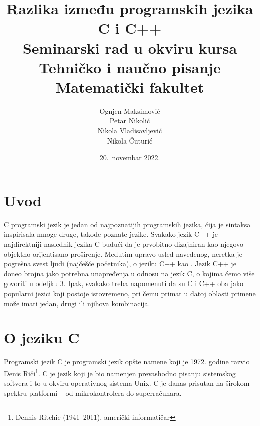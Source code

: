 \documentclass[a4paper]{article}
\begin{document}
\title{Razlika između programskih jezika C i C++\\ \small{Seminarski rad u okviru kursa\\Tehničko i naučno pisanje\\ Matematički fakultet}}

\author{Ognjen Maksimović\\ Petar Nikolić\\ Nikola Vladisavljević\\ Nikola Čuturić}
\date{20.~novembar 2022.}
\maketitle


\tableofcontents

\newpage

\section{Uvod}
\label{sec:uvod}
C programski jezik je jedan od najpoznatijih programskih jezika, čija je sintaksa inspirisala mnoge druge, takođe poznate jezike. Svakako jezik C++ je najdirektniji naslednik jezika C budući da je prvobitno dizajniran kao njegovo objektno orijentisano proširenje. Međutim upravo usled navedenog, neretka je pogrešna svest ljudi (najčešće početnika), o jeziku C++ kao . Jezik C++ je doneo brojna jako potrebna unapređenja u odnosu na jezik C, o kojima ćemo više govoriti u odeljku 3. Ipak, svakako treba napomenuti da su C i C++ oba jako popularni jezici koji postoje istovremeno, pri čemu primat u datoj oblasti primene može imati jedan, drugi ili njihova kombinacija.\cite{relevanceofc}

\section{O jeziku C}
Programski jezik C je programski jezik opšte namene koji je 1972. godine razvio Denis Riči\footnote{Dennis Ritchie (1941--2011), američki informatičar}. C je jezik koji je bio namenjen prevashodno pisanju sistemskog softvera i to u okviru operativnog sistema Unix. C je danas prisutan na širokom spektru platformi -- od mikrokontrolera do superračunara.
\end{document}
